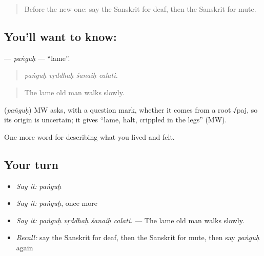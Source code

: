 \label{lesson:SA-C481-panguh}



\begin{quote}
Before the new one: say the Sanskrit for deaf, then the Sanskrit for mute.
\end{quote}

\subsection*{You'll want to know: }
\textbf{} — \emph{paṅguḥ} — \textquotedblleft{}lame\textquotedblright{}.

\begin{quote}
   
\end{quote}

\begin{quote}
\emph{paṅguḥ vṛddhaḥ śanaiḥ calati.}
\end{quote}

\begin{quote}
The lame old man walks slowly.
\end{quote}

\begin{cousinweb}
\textbf{} (\emph{paṅguḥ}) MW asks, with a question mark, whether it comes from a root √paj, so its origin is uncertain; it gives \textquotedblleft{}lame, halt, crippled in the legs\textquotedblright{} (MW).
\end{cousinweb}

\begin{grammarlens}[title={What you've built}]
One more word for describing what you lived and felt.
\end{grammarlens}

\subsection*{Your turn}
\begin{itemize}
\raggedright
  \item \emph{Say it:} \emph{paṅguḥ}
  \item \emph{Say it:} \emph{paṅguḥ}, once more
  \item \emph{Say it:} \emph{paṅguḥ vṛddhaḥ śanaiḥ calati.} — The lame old man walks slowly.
  \item \emph{Recall:} say the Sanskrit for deaf, then the Sanskrit for mute, then say \emph{paṅguḥ} again
\end{itemize}

